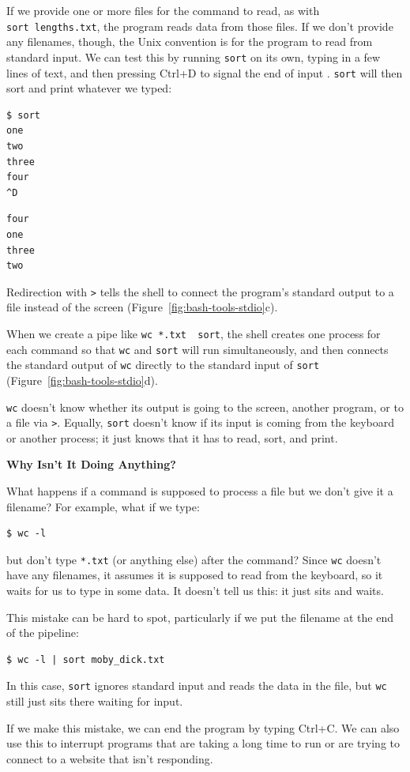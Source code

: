 \documentclass[
]{krantz}
\renewenvironment{quote}{\begin{VF}}{\end{VF}}
\begin{document}
If we provide one or more files for the command to read,
as with \texttt{sort\ lengths.txt},
the program reads data from those files.
If we don't provide any filenames,
though,
the Unix convention is for the program to read from standard input.
We can test this by running \texttt{sort} on its own,
typing in a few lines of text,
and then pressing Ctrl+D to signal the end of input .
\texttt{sort} will then sort and print whatever we typed:

\begin{verbatim}
$ sort
one
two
three
four
^D
\end{verbatim}

\begin{verbatim}
four
one
three
two
\end{verbatim}

Redirection with \texttt{\textgreater{}} tells the shell to connect the program's standard output to a file
instead of the screen (Figure~\ref{fig:bash-tools-stdio}c).

When we create a pipe like \texttt{wc\ *.txt\ \textbar{}\ sort},
the shell creates one process for each command so that \texttt{wc} and \texttt{sort} will run simultaneously,
and then connects the standard output of \texttt{wc} directly to the standard input of \texttt{sort}
(Figure~\ref{fig:bash-tools-stdio}d).

\texttt{wc} doesn't know whether its output is going to the screen,
another program,
or to a file via \texttt{\textgreater{}}.
Equally,
\texttt{sort} doesn't know if its input is coming from the keyboard or another process;
it just knows that it has to read, sort, and print.

\begin{quote}
\textbf{Why Isn't It Doing Anything?}

What happens if a command is supposed to process a file
but we don't give it a filename?
For example, what if we type:

\begin{verbatim}
$ wc -l
\end{verbatim}

but don't type \texttt{*.txt} (or anything else) after the command?
Since \texttt{wc} doesn't have any filenames,
it assumes it is supposed to read from the keyboard,
so it waits for us to type in some data.
It doesn't tell us this:
it just sits and waits.

This mistake can be hard to spot,
particularly if we put the filename at the end of the pipeline:

\begin{verbatim}
$ wc -l | sort moby_dick.txt
\end{verbatim}

In this case,
\texttt{sort} ignores standard input and reads the data in the file,
but \texttt{wc} still just sits there waiting for input.

If we make this mistake,
we can end the program by typing Ctrl+C.
We can also use this to interrupt programs that are taking a long time to run
or are trying to connect to a website that isn't responding.
\end{quote}
\end{document}
